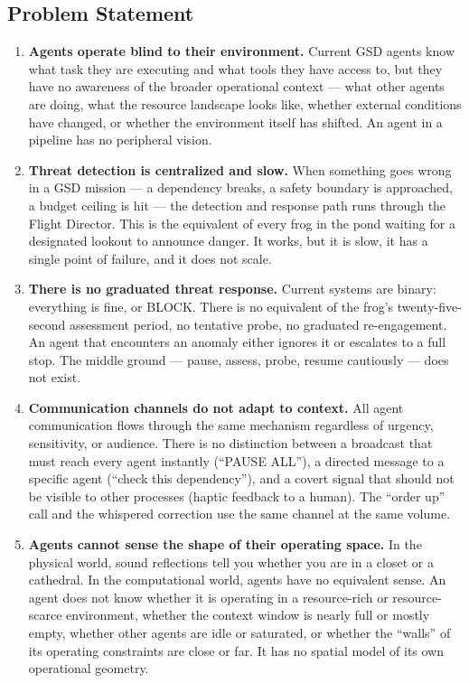 \documentclass[11pt,letterpaper]{article}
\begin{document}
\subsection{Problem Statement}

\begin{enumerate}[leftmargin=2em]
\item \textbf{Agents operate blind to their environment.} Current GSD agents know what task they are executing and what tools they have access to, but they have no awareness of the broader operational context --- what other agents are doing, what the resource landscape looks like, whether external conditions have changed, or whether the environment itself has shifted. An agent in a pipeline has no peripheral vision.

\item \textbf{Threat detection is centralized and slow.} When something goes wrong in a GSD mission --- a dependency breaks, a safety boundary is approached, a budget ceiling is hit --- the detection and response path runs through the Flight Director. This is the equivalent of every frog in the pond waiting for a designated lookout to announce danger. It works, but it is slow, it has a single point of failure, and it does not scale.

\item \textbf{There is no graduated threat response.} Current systems are binary: everything is fine, or BLOCK. There is no equivalent of the frog's twenty-five-second assessment period, no tentative probe, no graduated re-engagement. An agent that encounters an anomaly either ignores it or escalates to a full stop. The middle ground --- pause, assess, probe, resume cautiously --- does not exist.

\item \textbf{Communication channels do not adapt to context.} All agent communication flows through the same mechanism regardless of urgency, sensitivity, or audience. There is no distinction between a broadcast that must reach every agent instantly (``PAUSE ALL''), a directed message to a specific agent (``check this dependency''), and a covert signal that should not be visible to other processes (haptic feedback to a human). The ``order up'' call and the whispered correction use the same channel at the same volume.

\item \textbf{Agents cannot sense the shape of their operating space.} In the physical world, sound reflections tell you whether you are in a closet or a cathedral. In the computational world, agents have no equivalent sense. An agent does not know whether it is operating in a resource-rich or resource-scarce environment, whether the context window is nearly full or mostly empty, whether other agents are idle or saturated, or whether the ``walls'' of its operating constraints are close or far. It has no spatial model of its own operational geometry.


\end{enumerate}
\end{document}
